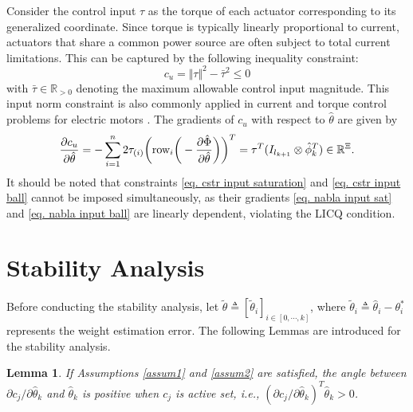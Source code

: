 \documentclass[lettersize,journal]{IEEEtran}
\newtheorem{lem}{Lemma}
\begin{document}
Consider the control input $\tau$ as the torque of each actuator corresponding to its generalized coordinate. Since torque is typically linearly proportional to current, actuators that share a common power source are often subject to total current limitations. This can be captured by the following inequality constraint: 
\begin{equation}
    c_{u}=\Vert\tau\Vert^2 -\bar\tau^2  \le 0
    \label{eq. cstr input ball}
\end{equation}
with $\bar\tau\in\mathbb{R}_{>0}$ denoting the maximum allowable control input magnitude. This input norm constraint is also commonly applied in current and torque control problems for electric motors \cite{RN62}.
The gradients of $c_{u}$ with respect to $\hat\theta$ are given by
\begin{equation}
    {\partial \mathbf \mathbf c_{u} \over \partial \hat\theta}
    = -\sum_{i=1}^n 2\tau_{(i)} 
    \bigg(
        \text{row}_i
        \bigg(
            -{\partial \hat\Phi\over\partial\hat\theta}
        \bigg)
    \bigg)^T  
    = \tau^T (I_{l_{k+1}}\otimes \hat\phi_k^T)
    \in \mathbb R^{\Xi}.
    \label{eq. nabla input ball}
\end{equation}
It should be noted that constraints \eqref{eq. cstr input saturation} and \eqref{eq. cstr input ball} cannot be imposed simultaneously, as their gradients \eqref{eq. nabla input sat} and \eqref{eq. nabla input ball} are linearly dependent, violating the LICQ condition.

\section{Stability Analysis}\label{sec:stability}

Before conducting the stability analysis, let $\tilde\theta\triangleq [\tilde\theta_i]_{i\in[0,\cdots,k]}$, where $\tilde\theta_i\triangleq\hat\theta_i-\theta^*_i$ represents the weight estimation error. The following Lemmas are introduced for the stability analysis. %
\begin{lem}
    If Assumptions \ref{assum1} and \ref{assum2} are satisfied, the angle between $\partial c_j/\partial \hat\theta_k$ and $\hat\theta_k$ is positive when $c_j$ is active set, i.e., $(\partial c_j/\partial \hat\theta_k)^T\hat\theta_k>0$.
    \label{lem1}
\end{lem}
\end{document}
